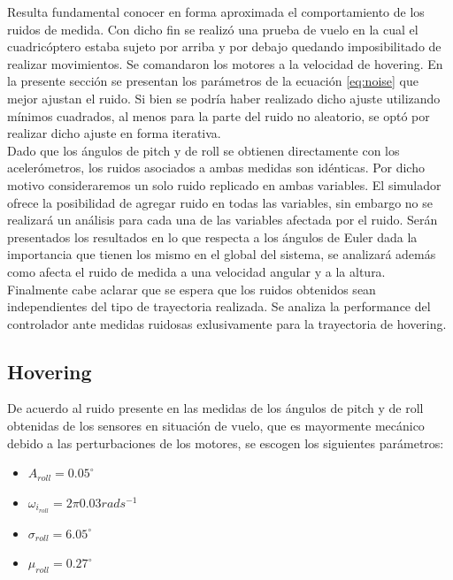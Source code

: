 \documentclass[main]{subfiles}
\begin{document}
Resulta fundamental conocer en forma aproximada el comportamiento de los ruidos de medida. Con dicho fin se realiz\'o una prueba de vuelo en la cual el cuadric\'optero estaba sujeto por arriba y por debajo quedando imposibilitado de realizar movimientos. Se comandaron los motores a la velocidad de hovering. En la presente secci\'on se presentan los par\'ametros de la ecuaci\'on \ref{eq:noise} que mejor ajustan el ruido. Si bien se podr\'ia haber realizado dicho ajuste utilizando m\'inimos cuadrados, al menos para la parte del ruido no aleatorio, se opt\'o por realizar dicho ajuste en forma iterativa.\\

Dado que los \'angulos de pitch y de roll se obtienen directamente con los aceler\'ometros, los ruidos asociados a ambas medidas son id\'enticas. Por dicho motivo consideraremos un solo ruido replicado en ambas variables. El simulador ofrece la posibilidad de agregar ruido en todas las variables, sin embargo no se realizar\'a un an\'alisis para cada una de las variables afectada por el ruido. Ser\'an presentados los resultados en lo que respecta a los \'angulos de Euler dada la importancia que tienen los mismo en el global del sistema, se analizar\'a adem\'as como afecta el ruido de medida a una velocidad angular y a la altura.\\

Finalmente cabe aclarar que se espera que los ruidos obtenidos sean independientes del tipo de trayectoria realizada. Se analiza la performance del controlador ante medidas ruidosas exlusivamente para la trayectoria de hovering.
\subsection{Hovering}

De acuerdo al ruido presente en las medidas de los \'angulos de pitch y de roll obtenidas de los sensores en situaci\'on de vuelo, que es mayormente mec\'anico debido a las perturbaciones de los motores, se escogen los siguientes par\'ametros:

\begin{itemize}
\item $A_{roll} = 0.05^\circ$
\item $\omega_{i_{roll}} = 2\pi 0.03 rads^{-1}$
\item $\sigma_{roll} = 6.05^\circ$
\item $\mu_{roll} = 0.27 ^\circ$
\end{itemize}
\end{document}
